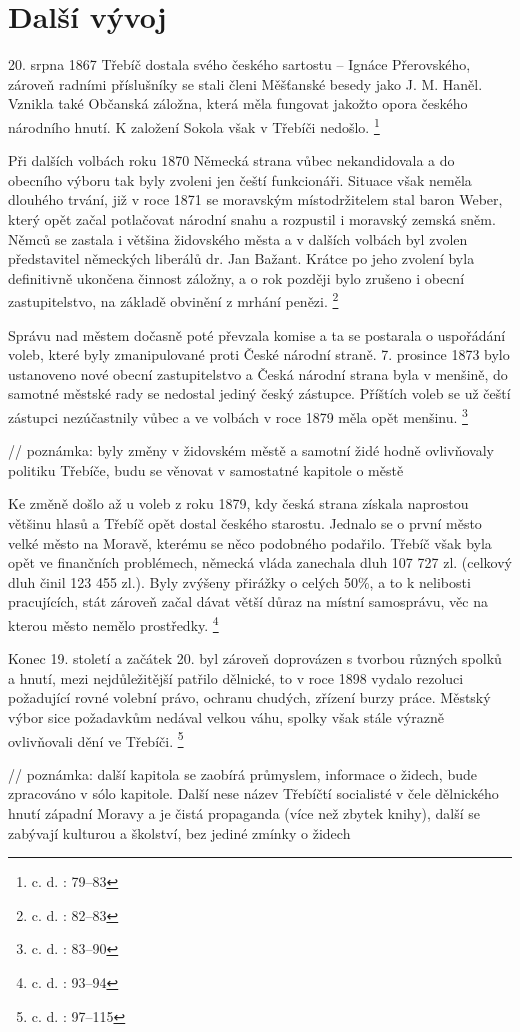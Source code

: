 \documentclass[a4paper,oneside,12p]{report}
\let\openright=\clearpage
\begin{document}
\section{Další vývoj}

20. srpna 1867 Třebíč dostala svého českého sartostu -- Ignáce Přerovského, zároveň radními příslušníky se stali členi Měšťanské besedy jako J. M. Haněl.
Vznikla také Občanská záložna, která měla fungovat jakožto opora českého národního hnutí.
K založení Sokola však v Třebíči nedošlo. \footnote{c. d. : 79--83}

Při dalších volbách roku 1870 Německá strana vůbec nekandidovala a do obecního výboru tak byly zvoleni jen čeští funkcionáři.
Situace však neměla dlouhého trvání, již v roce 1871 se moravským místodržitelem stal baron Weber, který opět začal potlačovat národní snahu a rozpustil i moravský zemská sněm.
Němců se zastala i většina židovského města a v dalších volbách byl zvolen představitel německých liberálů dr. Jan Bažant.
Krátce po jeho zvolení byla definitivně ukončena činnost záložny, a o rok později bylo zrušeno i obecní zastupitelstvo, na základě obvinění z mrhání penězi. \footnote{c. d. : 82--83}

Správu nad městem dočasně poté převzala komise a ta se postarala o uspořádání voleb, které byly zmanipulované proti České národní straně.
7. prosince 1873 bylo ustanoveno nové obecní zastupitelstvo a Česká národní strana byla v menšině, do samotné městské rady se nedostal jediný český zástupce.
Příštích voleb se už čeští zástupci nezúčastnily vůbec a ve volbách v roce 1879 měla opět menšinu. \footnote{c. d. : 83--90}

// poznámka: byly změny v židovském městě a samotní židé hodně ovlivňovaly politiku Třebíče, budu se věnovat v samostatné kapitole o městě

Ke změně došlo až u voleb z roku 1879, kdy česká strana získala naprostou většinu hlasů a Třebíč opět dostal českého starostu.
Jednalo se o první město velké město na Moravě, kterému se něco podobného podařilo.
Třebíč však byla opět ve finančních problémech, německá vláda zanechala dluh 107 727 zl. (celkový dluh činil 123 455 zl.).
Byly zvýšeny přirážky o celých 50\%, a to k nelibosti pracujících, stát zároveň začal dávat větší důraz na místní samosprávu, věc na kterou město nemělo prostředky. \footnote{c. d. : 93--94}

Konec 19. století a začátek 20. byl zároveň doprovázen s tvorbou různých spolků a hnutí, mezi nejdůležitější patřilo dělnické, to v roce 1898 vydalo rezoluci požadující rovné volební právo, ochranu chudých, zřízení burzy práce.
Městský výbor sice požadavkům nedával velkou váhu, spolky však stále výrazně ovlivňovali dění ve Třebíči. \footnote{c. d. : 97--115}


// poznámka: další kapitola se zaobírá průmyslem, informace o židech, bude zpracováno v sólo kapitole. Další nese název Třebíčtí socialisté v čele dělnického hnutí západní Moravy a je čistá propaganda (více než zbytek knihy), další se zabývají kulturou a školství, bez jediné zmínky o židech




\listoffigures
\openright
\end{document}
